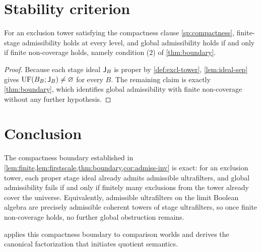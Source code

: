 \section{Stability criterion}
\begin{theorem}
	\label{thm:stability}
	For an exclusion tower satisfying the compactness clause
	\cref{sp:compactness}, finite-stage admissibility holds at every level,
	and global admissibility holds if and only if finite non-coverage
	holds, namely condition \textup{(2)} of \cref{thm:boundary}.
\end{theorem}
\begin{proof}
	Because each stage ideal \(\mathsf J_B\) is proper by
	\cref{def:excl-tower}, \cref{lem:ideal-sep} gives
	\(\operatorname{UF}(B_B;\mathsf J_B)\neq\varnothing\) for every \(B\).
	The remaining claim is exactly \cref{thm:boundary}, which identifies
	global admissibility with finite non-coverage without any further
	hypothesis.
\end{proof}
\section{Conclusion}
\label{sec:foundation-conclusion}
The compactness boundary established in
\cref{lem:finite,lem:firstscale,thm:boundary,cor:admiss-inv} is exact:
for an exclusion tower, each proper stage ideal already admits
admissible ultrafilters, and global admissibility fails if and only if
finitely many exclusions from the tower already cover the universe.
Equivalently, admissible ultrafilters on the limit Boolean algebra are
precisely admissible coherent towers of stage ultrafilters, so once
finite non-coverage holds, no further global obstruction remains.

 applies this compactness boundary to comparison worlds
and derives the canonical factorization that initiates quotient semantics.

\begin{chapterclosing}
\end{chapterclosing}
